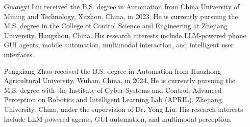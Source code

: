 \vspace{-3em}

\begin{IEEEbiography}{Guangyi Liu}
received the B.S. degree in Automation from China University of Mining and Technology, Xuzhou, China, in 2023. He is currently pursuing the M.S. degree in the College of Control Science and Engineering at Zhejiang University, Hangzhou, China. His research interests include LLM-powered phone GUI agents, mobile automation, multimodal interaction, and intelligent user interfaces.
\end{IEEEbiography}

\vspace{-3em}

\begin{IEEEbiography}{Pengxiang Zhao}
received the B.S. degree in Automation from Huazhong Agricultural University, Wuhan, China, in 2024. He is currently pursuing the M.S. degree with the Institute of Cyber-Systems and Control, Advanced Perception on Robotics and Intelligent Learning Lab (APRIL), Zhejiang University, China, under the supervision of Dr. Yong Liu. His research interests include LLM-powered agents, GUI automation, and multimodal perception.
\end{IEEEbiography}

\vspace{-3em}

